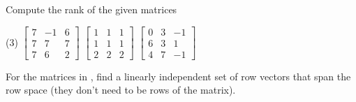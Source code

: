 \documentclass{ximera}
\begin{document}
\begin{exercise} \label{exercise:rankmatrixans}%
    Compute the rank of the given matrices
    \begin{tasks}(3)
        \task
        $\begin{bmatrix}
            7 & -1 & 6 \\
            7 & 7 & 7 \\
            7 & 6 & 2
        \end{bmatrix}$
        \task
        $\begin{bmatrix}
            1 & 1 & 1 \\
            1 & 1 & 1 \\
            2 & 2 & 2
        \end{bmatrix}$
        \task
        $\begin{bmatrix}
            0 & 3 & -1 \\
            6 & 3 & 1 \\
            4 & 7 & -1
        \end{bmatrix}$
    \end{tasks}
\end{exercise}


\begin{exercise}
    For the matrices in , find a linearly independent set of row vectors that span the row space (they don't need to be rows of the matrix).
\end{exercise}
\end{document}

